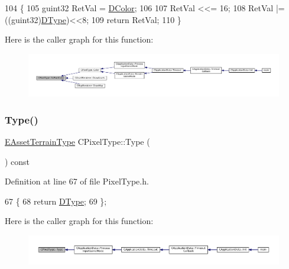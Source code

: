 \begin{DoxyCode}
104                                       \{
105     guint32 RetVal = \hyperlink{classCPixelType_a474243cf748aee94cfa207659e940b6c}{DColor};
106     
107     RetVal <<= 16;
108     RetVal |= ((guint32)\hyperlink{classCPixelType_aca37f042b510a349e0d3209c73ae51c5}{DType})<<8;
109     \textcolor{keywordflow}{return} RetVal;
110 \}
\end{DoxyCode}
Here is the caller graph for this function\+:\nopagebreak
\begin{figure}[H]
\begin{center}
\leavevmode
\includegraphics[width=350pt]{classCPixelType_abdad3e51c47f410745f7795931798cb3_icgraph}
\end{center}
\end{figure}
\hypertarget{classCPixelType_ac2d23be310266e7679b248435f05f2d3}{}\label{classCPixelType_ac2d23be310266e7679b248435f05f2d3} 
\subsubsection{\texorpdfstring{Type()}{Type()}}
{\footnotesize\ttfamily \hyperlink{classCPixelType_af06457fd1c2ff34c67ce670e633a10b0}{E\+Asset\+Terrain\+Type} C\+Pixel\+Type\+::\+Type (\begin{DoxyParamCaption}{ }\end{DoxyParamCaption}) const\hspace{0.3cm}{\ttfamily [inline]}}



Definition at line 67 of file Pixel\+Type.\+h.


\begin{DoxyCode}
67                                       \{
68             \textcolor{keywordflow}{return} \hyperlink{classCPixelType_aca37f042b510a349e0d3209c73ae51c5}{DType};  
69         \};
\end{DoxyCode}
Here is the caller graph for this function\+:\nopagebreak
\begin{figure}[H]
\begin{center}
\leavevmode
\includegraphics[width=350pt]{classCPixelType_ac2d23be310266e7679b248435f05f2d3_icgraph}
\end{center}
\end{figure}


